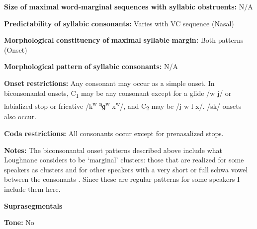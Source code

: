 \documentclass[output=paper]{langsci/langscibook}
\begin{document}
\begin{styleBody}
\textbf{Size} \textbf{of} \textbf{maximal} \textbf{word{}-marginal sequences with syllabic obstruents:} N/A
\end{styleBody}

\begin{styleBody}
\textbf{Predictability} \textbf{of} \textbf{syllabic} \textbf{consonants:} Varies with VC sequence (Nasal)
\end{styleBody}

\begin{styleBody}
\textbf{Morphological} \textbf{constituency} \textbf{of} \textbf{maximal} \textbf{syllable} \textbf{margin:} Both patterns (Onset)
\end{styleBody}

\begin{styleBody}
\textbf{Morphological} \textbf{pattern} \textbf{of} \textbf{syllabic} \textbf{consonants:} N/A
\end{styleBody}

\begin{styleBody}
\textbf{Onset} \textbf{restrictions:} Any consonant may occur as a simple onset. In biconsonantal onsets, C\textsubscript{1} may be any consonant except for a glide /w j/ or labialized stop or fricative /k\textsuperscript{w} \textsuperscript{ŋ}ɡ\textsuperscript{w} x\textsuperscript{w}/, and C\textsubscript{2} may be /j w l x/. /sk/ onsets also occur.
\end{styleBody}

\begin{styleBody}
\textbf{Coda} \textbf{restrictions:} All consonants occur except for prenasalized stops.
\end{styleBody}

\begin{styleBody}
\textbf{Notes:} The biconsonantal onset patterns described above include what Loughnane considers to be ‘marginal’ clusters: those that are realized for some speakers as clusters and for other speakers with a very short or full schwa vowel between the consonants \citep[64-5]{Loughnane2009}. Since these are regular patterns for some speakers I include them here.
\end{styleBody}

\begin{styleBody}
\textbf{Suprasegmentals}
\end{styleBody}

\begin{styleBody}
\textbf{Tone:} No
\end{styleBody}
\end{document}
